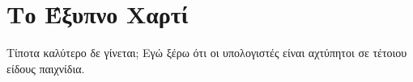 \documentclass[a4paper,11pt,oneside]{book}
\begin{document}



\section{Το Έξυπνο Χαρτί}

\begin{question}
Τίποτα καλύτερο δε γίνεται; Εγώ ξέρω ότι οι υπολογιστές είναι αχτύπητοι σε τέτοιου είδους παιχνίδια.
\end{question}
\end{document}
